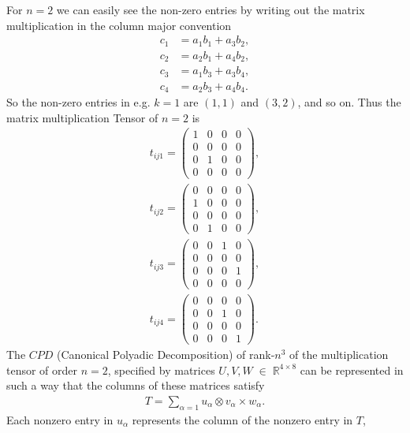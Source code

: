 \documentclass[a4paper]{article}
\begin{document}
For $n = 2$ we can easily see the non-zero entries by writing out the matrix
multiplication in the column major convention
\begin{align}
    c_1 &= a_1b_1 + a_3b_2,\\
    c_2 &= a_2b_1 + a_4b_2,\\
    c_3 &= a_1b_3 + a_3b_4,\\
    c_4 &= a_2b_3 + a_4b_4.
\end{align}
So the non-zero entries in e.g. $k=1$ are $(1, 1)$ and $(3, 2)$, and so on.
Thus the matrix multiplication Tensor of $n=2$ is
\begin{align}
t_{ij1} = \begin{pmatrix}
    1 & 0 & 0 & 0\\
    0 & 0 & 0 & 0\\
    0 & 1 & 0 & 0\\
    0 & 0 & 0 & 0
    \end{pmatrix},\\
t_{ij2}=
\begin{pmatrix}
    0 & 0 & 0 & 0\\
    1 & 0 & 0 & 0\\
    0 & 0 & 0 & 0\\
    0 & 1 & 0 & 0
\end{pmatrix},\\
t_{ij3}=
\begin{pmatrix}
    0 & 0 & 1 & 0\\
    0 & 0 & 0 & 0\\
    0 & 0 & 0 & 1\\
    0 & 0 & 0 & 0
\end{pmatrix},\\
t_{ij4}=
\begin{pmatrix}
    0 & 0 & 0 & 0\\
    0 & 0 & 1 & 0\\
    0 & 0 & 0 & 0\\
    0 & 0 & 0 & 1
\end{pmatrix}.
\end{align}
The $CPD$ (Canonical Polyadic Decomposition) of rank-$n^3$ of the multiplication tensor of
order $n = 2$, specified by matrices $U, V, W \;\in \; \mathbb{R}^{4\times 8}$
can be represented in such a way that the columns of these matrices satisfy
\begin{align}
    T = \sum_{\alpha=1}u_\alpha \otimes v_\alpha \times w_\alpha.
\end{align}
Each nonzero entry in $u_\alpha$ represents the column of the nonzero entry in $T$,
\end{document}
